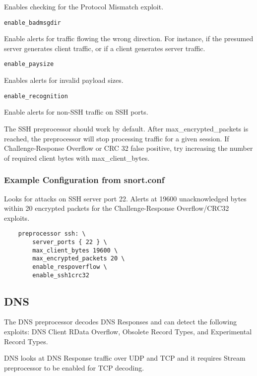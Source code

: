 \documentclass[english]{report}
\newcounter{slistnum}
\newenvironment{slist}
{ \begin{list}{ {\bf \arabic{slistnum}.} }{\usecounter{slistnum} } }
{ \end{list} }
\begin{document}
\begin{slist}
Enables checking for the Protocol Mismatch exploit.

\item \texttt{enable\_badmsgdir}

Enable alerts for traffic flowing the wrong direction. For instance, if the
presumed server generates client traffic, or if a client generates server
traffic.

\item \texttt{enable\_paysize}

Enables alerts for invalid payload sizes.

\item \texttt{enable\_recognition}

Enable alerts for non-SSH traffic on SSH ports.

\end{slist}

The SSH preprocessor should work by default.  After max\_encrypted\_packets is
reached, the preprocessor will stop processing traffic for a given session.  If
Challenge-Response Overflow or CRC 32 false positive, try increasing the number
of required client bytes with max\_client\_bytes.

\subsubsection{Example Configuration from snort.conf}

Looks for attacks on SSH server port 22.  Alerts at 19600 unacknowledged bytes
within 20 encrypted packets for the Challenge-Response Overflow/CRC32 exploits.

\begin{verbatim}
    preprocessor ssh: \
        server_ports { 22 } \
        max_client_bytes 19600 \
        max_encrypted_packets 20 \
        enable_respoverflow \
        enable_ssh1crc32
\end{verbatim}

\subsection{DNS}
\label{sub:dns}

The DNS preprocessor decodes DNS Responses and can detect the following
exploits: DNS Client RData Overflow, Obsolete Record Types, and Experimental
Record Types.

DNS looks at DNS Response traffic over UDP and TCP and it requires Stream
preprocessor to be enabled for TCP decoding.
\end{document}
